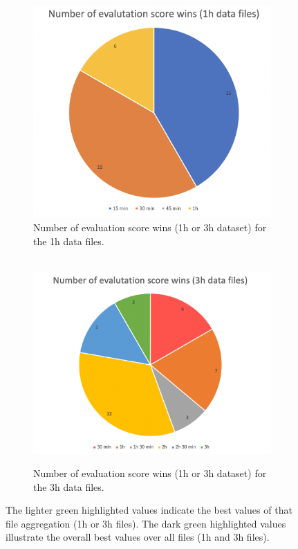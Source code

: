 \begin{figure}
  \centering
  \begin{subfigure}{.475\textwidth}
    \centering
    \includegraphics[width=1\textwidth]{./images/clusteringResults/clusteringResultsGraph1h.png}
    \caption{Number of evaluation score wins (1h or 3h dataset) for the 1h data files.}
    \label{figure:clusteringResultsGraph1h}
  \end{subfigure}%
  \hfill
  \begin{subfigure}{.475\textwidth}
    \centering
    \  \includegraphics[width=1.2\textwidth]{./images/clusteringResults/clusteringResultsGraph3h.png}
    \caption{Number of evaluation score wins (1h or 3h dataset) for the 3h data files.}
    \label{figure:clusteringResultsGraph3h}
  \end{subfigure}
	\caption{ The lighter green highlighted values indicate the best values of that file aggregation (1h or 3h files). The dark green highlighted values illustrate the overall best values over all files (1h and 3h files).}
\end{figure}


